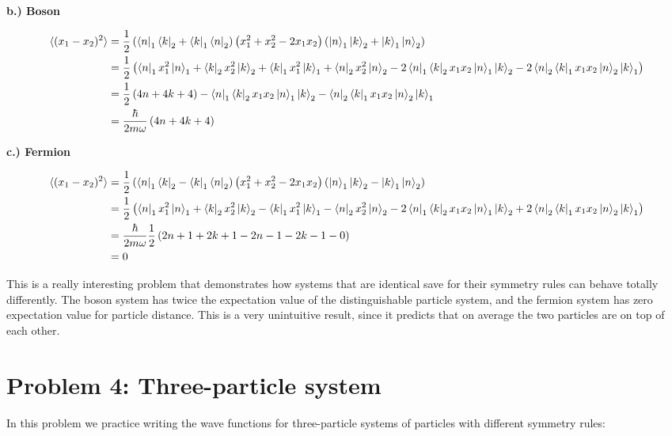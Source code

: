 \documentclass[10pt]{article} %
\begin{document}
\textbf{b.) Boson}

\begin{align*}
  \braket{(x_1-x_2)^2} &=
  \frac{1}{2}\left(\bra{n}_1\bra{k}_2 + \bra{k}_1\bra{n}_2\right)
  \left(x_1^2 + x_2^2 - 2x_1x_2\right)
  \left(\ket{n}_1\ket{k}_2 + \ket{k}_1\ket{n}_2\right)\\
  &= \frac{1}{2}\left(
  \bra{n}_1x_1^2\ket{n}_1 + \bra{k}_2x_2^2\ket{k}_2
  + \bra{k}_1x_1^2\ket{k}_1 + \bra{n}_2x_2^2\ket{n}_2
  - 2\bra{n}_1\bra{k}_2x_1x_2\ket{n}_1\ket{k}_2 - 2\bra{n}_2\bra{k}_1x_1x_2\ket{n}_2\ket{k}_1\right)\\
  &= \frac{1}{2}\left(4n + 4k + 4\right)
  - \bra{n}_1\bra{k}_2x_1x_2\ket{n}_1\ket{k}_2 - \bra{n}_2\bra{k}_1x_1x_2\ket{n}_2\ket{k}_1\\
  &= \frac{\hbar}{2m\omega}\left(4n + 4k + 4\right)\\
\end{align*}

\textbf{c.) Fermion}

\begin{align*}
  \braket{(x_1-x_2)^2} &=
  \frac{1}{2}\left(\bra{n}_1\bra{k}_2 - \bra{k}_1\bra{n}_2\right)
  \left(x_1^2 + x_2^2 - 2x_1x_2\right)
  \left(\ket{n}_1\ket{k}_2 - \ket{k}_1\ket{n}_2\right)\\
  &= \frac{1}{2}\left(
  \bra{n}_1x_1^2\ket{n}_1 + \bra{k}_2x_2^2\ket{k}_2
  - \bra{k}_1x_1^2\ket{k}_1 - \bra{n}_2x_2^2\ket{n}_2
  - 2\bra{n}_1\bra{k}_2x_1x_2\ket{n}_1\ket{k}_2 + 2\bra{n}_2\bra{k}_1x_1x_2\ket{n}_2\ket{k}_1\right)\\
  &= \frac{\hbar}{2m\omega}\frac{1}{2}\left(2n+1 + 2k+1 - 2n-1 - 2k-1 - 0\right)\\
  &= 0\\
\end{align*}

This is a really interesting problem that demonstrates how systems that are identical save
for their symmetry rules can behave totally differently. The boson system has twice the expectation
value of the distinguishable particle system, and the fermion system has zero expectation value
for particle distance. This is a very unintuitive result, since it predicts that on average the
two particles are on top of each other.\\

\section{Problem 4: Three-particle system}
In this problem we practice writing the wave functions for three-particle systems of particles
with different symmetry rules:\\
\end{document}

